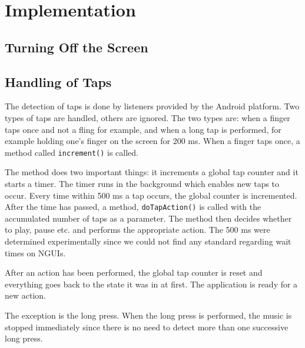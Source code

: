 \section{Implementation}
\subsection{Turning Off the Screen}

\subsection{Handling of Taps}
The detection of taps is done by listeners provided by the Android platform. Two types of taps are handled, others are ignored. The two types are: when a finger taps once and not a fling for example, and when a long tap is performed, for example holding one's finger on the screen for 200 ms. When a finger taps once, a method called \texttt{increment()} is called.

The method does two important things: it increments a global tap counter and it starts a timer. The timer runs in the background which enables new taps to occur. Every time within 500 ms a tap occurs, the global counter is incremented. After the time has passed, a method, \texttt{doTapAction()} is called with the accumulated number of taps as a parameter. The method then decides whether to play, pause etc. and performs the appropriate action. The 500 ms were determined experimentally since we could not find any standard regarding wait times on NGUIs.

After an action has been performed, the global tap counter is reset and everything goes back to the state it was in at first. The application is ready for a new action.

The exception is the long press. When the long press is performed, the music is stopped immediately since there is no need to detect more than one successive long press.
